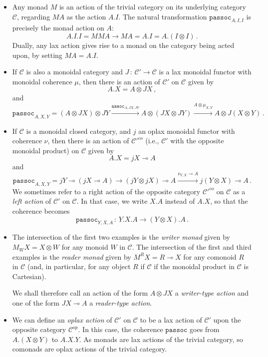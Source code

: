 \documentclass{svproc}
\newcommand\C{\mathcal{C}}
\newcommand\from{\,\colon\,}
\newcommand{\passoc}{\texttt{passoc}}
\newcommand{\assoc}{\texttt{assoc}}
\newcommand\tensor\otimes
\renewcommand\implies\multimap
\begin{document}
\begin{example}
  \begin{itemize}
    \item Any monad $M$ is an action of the trivial category on its underlying category $\C$, regarding $MA$ as the action $A.I$.
      The natural transformation $\passoc_{A,I,I}$ is precisely the monad action on $A$:
      \[
        A.I.I = MMA \to M A = A.I = A.(I\tensor I)\,.
        \]
      Dually, any lax action gives rise to a monad on the category being acted upon, by setting $MA = A.I$.
    \item If $\C$ is also a monoidal category and $J\from \C'\to \C$ is a lax monoidal functor with monoidal coherence $\mu$, then there is an action of $\C'$ on $\C$ given by
      \[
        A.X = A \tensor JX\,,
        \]
      and
      \[
        \passoc_{A,X,Y}=
        (A \tensor JX) \tensor JY \xrightarrow{\assoc_{A,JX,JY}}
        A \tensor (JX \tensor JY) \xrightarrow{A \tensor \mu_{X,Y}}
        A \tensor J(X\tensor Y)\,.
        \]

    \item If $\C$ is a monoidal closed category, and $j$ an oplax monoidal functor with coherence $\nu$, then there is an action of $\C'^{co}$ (i.e., $\C'$ with the opposite monoidal product) on $\C$ given by
      \[
        A.X = jX \implies A
        \]
      and
      \[
        \passoc_{A,X,Y}=jY \implies (jX \implies A) \to
        (jY \tensor jX) \implies A \xrightarrow{\nu_{Y,X}\implies A}
        j(Y \tensor X) \implies A\,.
        \]
      We sometimes refer to a right action of the opposite category $\C'^{co}$ on $\C$ as a \emph{left action} of $\C'$ on $\C$.  
      In that case, we write $X.A$ instead of $A.X$, so that the coherence becomes
      \[
        \passoc_{Y,X,A}\from Y.X.A \to (Y\tensor X).A\,.
        \]
    \item The intersection of the first two examples is the \emph{writer monad} given by $M_WX = X\tensor W$ for any monoid $W$ in $\C$.  
      The intersection of the first and third examples is the \emph{reader monad} given by $M^RX = R \implies X$ for any comonoid $R$ in $\C$ (and, in particular, for any object $R$ if $\C$ if the monoidal product in $\C$ is Cartesian).
      
      We shall therefore call an action of the form $A \tensor JX$ a \emph{writer-type action} and one of the form $JX \implies A$ a \emph{reader-type action}.
    \item We can define an \emph{oplax action} of $\C'$ on $\C$ to be a lax action of $\C'$ upon the opposite category $\C^{op}$.  
      In this case, the coherence $\passoc$ goes from $A.(X\tensor Y)$ to $A.X.Y$.  
      As monads are lax actions of the trivial category, so comonads are oplax actions of the trivial category.
  \end{itemize}
\end{example}



\end{document}

